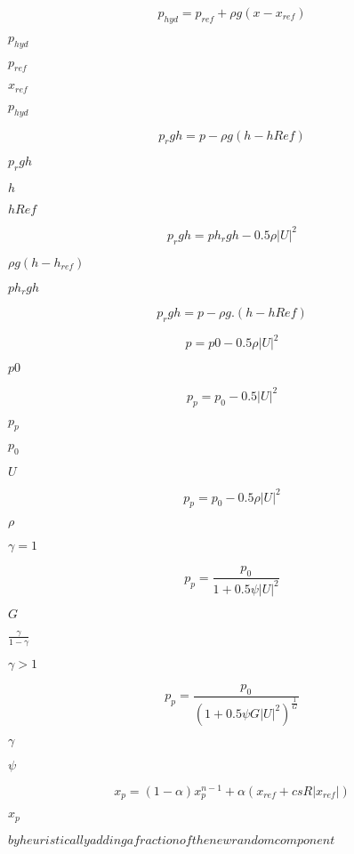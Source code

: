 \documentclass{article}
\begin{document}
\[
        p_{hyd} = p_{ref} + \rho g (x - x_{ref})
    \]
\pagebreak

$        p_{hyd} $
\pagebreak

$        p_{ref} $
\pagebreak

$        x_{ref} $
\pagebreak

$p_{hyd}$
\pagebreak

\[
        p_rgh = p - \rho g (h - hRef)
    \]
\pagebreak

$        p_rgh   $
\pagebreak

$        h       $
\pagebreak

$        hRef    $
\pagebreak

\[
        p_rgh = ph_rgh - 0.5 \rho |U|^2
    \]
\pagebreak

$ \rho g (h - h_{ref}) $
\pagebreak

$        ph_rgh  $
\pagebreak

\[
        p_rgh = p - \rho g.(h - hRef)
    \]
\pagebreak

\[
        p = p0 - 0.5 \rho |U|^2
    \]
\pagebreak

$        p0      $
\pagebreak

\[
        p_p = p_0 - 0.5 |U|^2
    \]
\pagebreak

$            p_p     $
\pagebreak

$            p_0     $
\pagebreak

$            U       $
\pagebreak

\[
            p_p = p_0 - 0.5 \rho |U|^2
        \]
\pagebreak

$            \rho    $
\pagebreak

$\gamma = 1$
\pagebreak

\[
            p_p = \frac{p_0}{1 + 0.5 \psi |U|^2}
        \]
\pagebreak

$            G       $
\pagebreak

$\frac{\gamma}{1-\gamma}$
\pagebreak

$\gamma > 1$
\pagebreak

\[
            p_p = \frac{p_0}{(1 + 0.5 \psi G |U|^2)^{\frac{1}{G}}}
        \]
\pagebreak

$            \gamma  $
\pagebreak

$            \psi    $
\pagebreak

\[
    x_p = (1 - \alpha) x_p^{n - 1} + \alpha (x_{ref} + c s R |x_{ref}|)
\]
\pagebreak

$        x_p     $
\pagebreak

$                  by heuristically adding a fraction of the new random component$
\pagebreak
\end{document}
